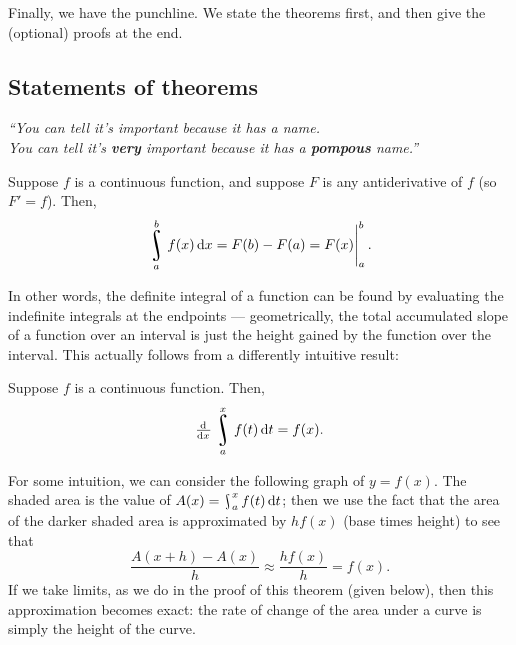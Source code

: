 


Finally, we have the punchline. We state the theorems first, and then give the (optional) proofs at the end.

\subsection*{Statements of theorems}
\begin{center}\itshape
  ``You can tell it's important because it has a name.\\You can tell it's \textbf{very} important because it has a \textbf{pompous} name.''
\end{center}

\begin{bthm}
  Suppose $ f $ is a continuous function, and suppose $ F $ is any antiderivative of $ f $ (so $ F' = f $). Then,
  \begin{displaymath}
    \rint^b_a f(x) \dif{x} = F(b) - F(a) = \eval{F(x)}_a^b.
  \end{displaymath}
\end{bthm}

In other words, the definite integral of a function can be found by evaluating the indefinite integrals at
the endpoints --- geometrically, the total accumulated slope of a function over an interval is just the height
gained by the function over the interval. This actually follows from a differently intuitive result:

\begin{bthm}
  Suppose $ f $ is a continuous function. Then,
  \begin{displaymath}
    \od{}{x} \rint^x_a f(t) \dif{t} = f(x).
  \end{displaymath}
\end{bthm}

For some intuition, we can consider the following graph of $ y = f(x) $. The shaded area is the value of $ A(x) = \rint^x_a f(t) \dif{t} $;
then we use the fact that the area of the darker shaded area is approximated by $ h f(x) $ (base times height) to see that
\begin{displaymath}
  \frac{A(x + h) - A(x)}{h} \approx \frac{h f(x)}{h} = f(x).
\end{displaymath}
If we take limits, as we do in the proof of this theorem (given below), then this approximation becomes exact: the rate of change of
the area under a curve is simply the height of the curve.

